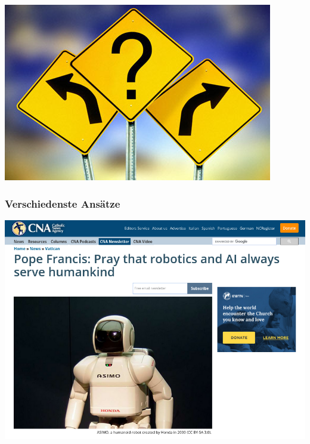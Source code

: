 \documentclass[aspectratio=169,xcolor=dvipsnames]{beamer}
\begin{document}
\begin{frame}
\begin{center}
\includegraphics[height=0.7\paperheight,keepaspectratio]{images/quo-vadis} 
\end{center}
\end{frame}

\begin{frame}
\frametitle{Verschiedenste Ansätze}
\begin{center}
\includegraphics[height=0.7\paperheight,keepaspectratio]{images/pope_pray} 
\end{center}
\end{frame}
\end{document}

